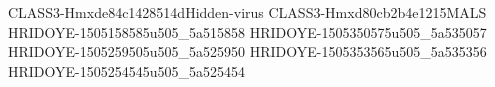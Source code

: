 CLASS3-Hmxde84c1428514dHidden-virus
CLASS3-Hmxd80cb2b4e1215MALS
HRIDOYE-1505158585u505_5a515858
HRIDOYE-1505350575u505_5a535057
HRIDOYE-1505259505u505_5a525950
HRIDOYE-1505353565u505_5a535356
HRIDOYE-1505254545u505_5a525454
